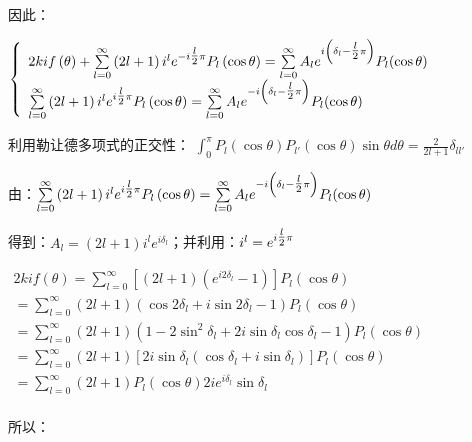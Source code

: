 因此：

$\left\{ \begin{array}{l}
 2kif\left( \theta  \right) + \sum\limits_{l = 0}^\infty  {\left( {2l + 1} \right)i^l e^{ - i{\textstyle{l \over 2}}\pi } P_l \left( {\cos \theta } \right)}  = \sum\limits_{l = 0}^\infty  {A_l e^{i\left( {\delta _l  - {\textstyle{l \over 2}}\pi } \right)} P_l (\cos \theta )}  \\
 \sum\limits_{l = 0}^\infty  {\left( {2l + 1} \right)i^l e^{i{\textstyle{l \over 2}}\pi } P_l \left( {\cos \theta } \right)}  = \sum\limits_{l = 0}^\infty  {A_l e^{ - i\left( {\delta _l  - {\textstyle{l \over 2}}\pi } \right)} P_l (\cos \theta )}  \\
 \end{array} \right.$


利用勒让德多项式的正交性：
$\int_0^\pi  {P_l \left( {\cos \theta } \right)P_{l'} \left( {\cos \theta } \right)} \sin \theta d\theta  = \frac{2}{{2l + 1}}\delta _{ll'} $


由：$\sum\limits_{l = 0}^\infty  {\left( {2l + 1} \right)i^l e^{i{\textstyle{l \over 2}}\pi } P_l \left( {\cos \theta } \right)}  = \sum\limits_{l = 0}^\infty  {A_l e^{ - i\left( {\delta _l  - {\textstyle{l \over 2}}\pi } \right)} P_l (\cos \theta )} $


得到：$A_l  = \left( {2l + 1} \right)i^l e^{i\delta _l } $；并利用：$i^l  = e^{i{\textstyle{l \over 2}}\pi } $


$\begin{array}{l}
 2kif\left( \theta  \right) = \sum\limits_{l = 0}^\infty  {\left[ {\left( {2l + 1} \right)\left( {e^{i2\delta _l }  - 1} \right)} \right]P_l (\cos \theta )}  \\ =  \sum\limits_{l = 0}^\infty  {\left( {2l + 1} \right)\left( {\cos 2\delta _l  + i\sin 2\delta _l  - 1} \right)P_l (\cos \theta )}  \\
  = \sum\limits_{l = 0}^\infty  {\left( {2l + 1} \right)\left( {1 - 2\sin ^2 \delta _l  + 2i\sin \delta _l \cos \delta _l  - 1} \right)P_l (\cos \theta )}  \\
  = \sum\limits_{l = 0}^\infty  {\left( {2l + 1} \right)\left[ {2i\sin \delta _l \left( {\cos \delta _l  + i\sin \delta _l } \right)} \right]P_l (\cos \theta )}  \\
  = \sum\limits_{l = 0}^\infty  {\left( {2l + 1} \right)P_l (\cos \theta )2ie^{i\delta _l } \sin \delta _l }  \\
 \end{array}$


所以：


